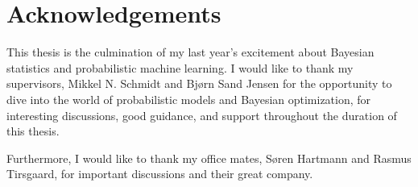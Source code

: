 \section*{Acknowledgements}
This thesis is the culmination of my last year's excitement about Bayesian statistics and
probabilistic machine learning. I would like to thank my supervisors, Mikkel N. Schmidt and Bjørn
Sand Jensen for the opportunity to dive into the world of probabilistic models and Bayesian
optimization, for interesting discussions, good guidance, and support throughout the duration of
this thesis. 

Furthermore, I would like to thank my office mates, Søren Hartmann and Rasmus Tirsgaard, for important
discussions and their great company. 







